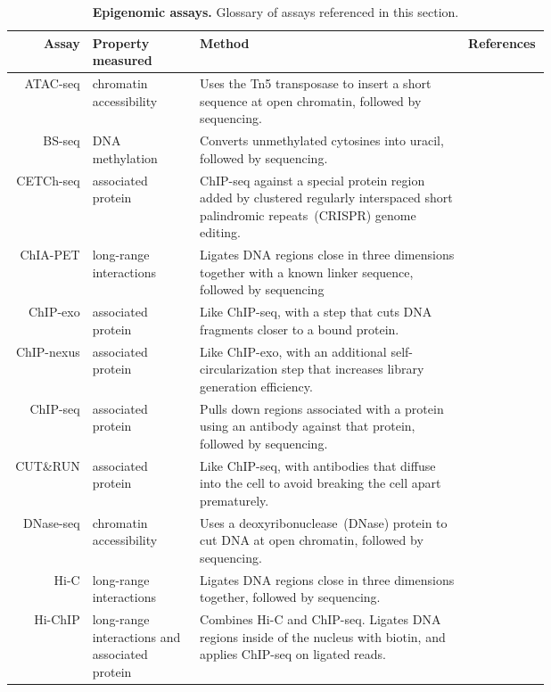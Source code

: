 \documentclass[5p]{elsarticle}
\begin{document}
\begin{table*}[t]
  \centering
  \begin{tabular*}{\linewidth}{r >{\raggedright}p{0.2\linewidth} @{\extracolsep{\fill}}p{0.5\linewidth} l}
    \toprule
    \textbf{Assay} & \textbf{Property measured} & \textbf{Method} & \textbf{References} \\
    \midrule
    ATAC-seq & chromatin accessibility & Uses the Tn5 transposase to insert a short sequence at open chromatin, followed by sequencing. & \cite{Buenrostro2013TranspositionPosition} \\
    BS-seq & DNA methylation & Converts unmethylated cytosines into uracil, followed by sequencing. & \cite{Cokus2008ShotgunPatterning} \\
      CETCh-seq & associated protein & ChIP-seq against a special protein region added by clustered regularly interspaced short palindromic repeats~(CRISPR) genome editing. & \cite{Arnold2013ModelingTargeting, Savic2015CETCh-seq:Proteins} \\
    ChIA-PET & long-range interactions & Ligates DNA regions close in three dimensions together with a known linker sequence, followed by sequencing & \cite{Fullwood2009AnInteractome} \\
    ChIP-exo & associated protein & Like ChIP-seq, with a step that cuts DNA fragments closer to a bound protein. & \cite{Rhee2012ChIP-exoAccuracy} \\
    ChIP-nexus & associated protein & Like ChIP-exo, with an additional self-circularization step that increases library generation efficiency. & \cite{He2015ChIP-nexusFootprints} \\
    ChIP-seq & associated protein & Pulls down regions associated with a protein using an antibody against that protein, followed by sequencing. & \cite{Johnson2007Genome-wideInteractions,Robertson2007Genome-wideSequencing,Barski2007High-ResolutionGenome,Mikkelsen2007Genome-wideCells} \\
    CUT\&RUN & associated protein & Like ChIP-seq, with antibodies that diffuse into the cell to avoid breaking the cell apart prematurely. & \cite{Skene2017AnSites} \\
    DNase-seq & chromatin accessibility & Uses a deoxyribonuclease~(DNase) protein to cut DNA at open chromatin, followed by sequencing. & \cite{Song2010DNase-seq:Cells} \\
    Hi-C & long-range interactions & Ligates DNA regions close in three dimensions together, followed by sequencing. & \cite{Lieberman-Aiden2009ComprehensiveGenome,deWit2012AOrganization} \\
    Hi-ChIP & long-range interactions and associated protein & Combines Hi-C and ChIP-seq. Ligates DNA regions inside of the nucleus with biotin, and applies ChIP-seq on ligated reads. & \cite{Mumbach2016HiChIP:Architecture} \\
    \bottomrule
  \end{tabular*}
  \caption{\textbf{Epigenomic assays.} Glossary of assays referenced in this section.}
  \label{tab:epig-glossary-assays}
\end{table*}
\end{document}
